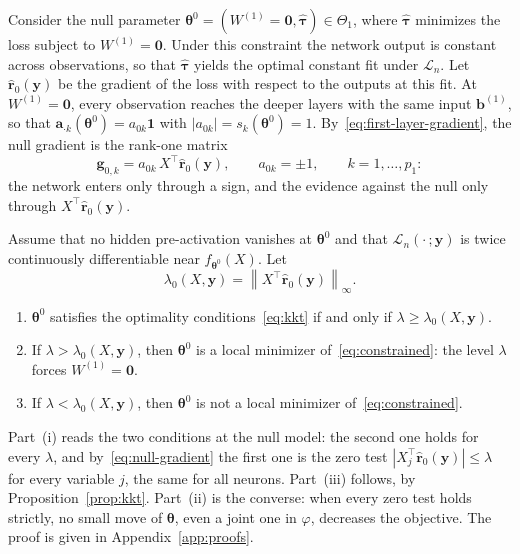 \documentclass[twoside,11pt]{article}
\newcommand{\bth}{\boldsymbol{\theta}}
\newcommand{\ba}{\mathbf{a}}
\newcommand{\by}{\mathbf{y}}
\newcommand{\bone}{\mathbf{1}}
\newcommand{\bzero}{\mathbf{0}}
\newcommand{\Wone}{W^{(1)}}
\newcommand{\Thetaone}{\Theta_{1}}
\begin{document}
Consider the null parameter $\bth^0=(\Wone=\mathbf{0},\hat{\boldsymbol{\tau}})\in\Thetaone$, where $\hat{\boldsymbol{\tau}}$ minimizes the loss subject to $\Wone=\mathbf{0}$. Under this constraint the network output is constant across observations, so that $\hat{\boldsymbol{\tau}}$ yields the optimal constant fit under $\mathcal L_n$. Let $\hat{\mathbf r}_0(\by)$ be the gradient of the loss with respect to the outputs at this fit. At $\Wone=\mathbf{0}$, every observation reaches the deeper layers with the same input $\mathbf b^{(1)}$, so that $\ba_{\cdot k}(\bth^0)=a_{0k}\bone$ with $|a_{0k}|=s_k(\bth^0)=1$. By~\eqref{eq:first-layer-gradient}, the null gradient is the rank-one matrix
\begin{equation}\label{eq:null-gradient}
    \mathbf g_{0,k}=a_{0k}\,X^\top\hat{\mathbf r}_0(\by),\qquad a_{0k}=\pm1,\qquad k=1,\ldots,p_1 :
\end{equation}
the network enters only through a sign, and the evidence against the null only through $X^\top\hat{\mathbf r}_0(\by)$.

\begin{theorem}\label{thm:ztffunc}
Assume that no hidden pre-activation vanishes at $\bth^0$ and that $\mathcal L_n(\cdot\,;\by)$ is twice continuously differentiable near $f_{\bth^0}(X)$. Let
\begin{equation*}
    \lambda_0(X,\by)=\left\|X^\top\hat{\mathbf r}_0(\by)\right\|_\infty .
\end{equation*}
\begin{enumerate}
\item[(i)] $\bth^0$ satisfies the optimality conditions~\eqref{eq:kkt} if and only if $\lambda\geq\lambda_0(X,\by)$.
\item[(ii)] If $\lambda>\lambda_0(X,\by)$, then $\bth^0$ is a local minimizer of~\eqref{eq:constrained}: the level $\lambda$ forces $\Wone=\bzero$.
\item[(iii)] If $\lambda<\lambda_0(X,\by)$, then $\bth^0$ is not a local minimizer of~\eqref{eq:constrained}.
\end{enumerate}
\end{theorem}

Part~(i) reads the two conditions at the null model: the second one holds for every $\lambda$, and by~\eqref{eq:null-gradient} the first one is the zero test $|X_j^\top\hat{\mathbf r}_0(\by)|\leq\lambda$ for every variable $j$, the same for all neurons. Part~(iii) follows, by Proposition~\ref{prop:kkt}. Part~(ii) is the converse: when every zero test holds strictly, no small move of $\bth$, even a joint one in $\varphi$, decreases the objective. The proof is given in Appendix~\ref{app:proofs}.
\end{document}
